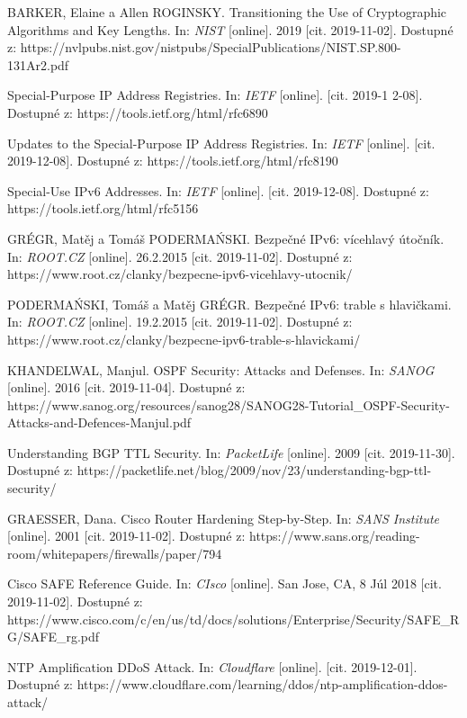 \begin{literatura}{99}
BARKER, Elaine a Allen ROGINSKY. Transitioning the Use of Cryptographic Algorithms and Key Lengths. In: \textit{NIST} [online]. 2019 [cit. 2019-11-02]. Dostupné z: https://nvlpubs.nist.gov/nistpubs/SpecialPublications/NIST.SP.800-131Ar2.pdf

Special-Purpose IP Address Registries. In: \textit{IETF} [online]. [cit. 2019-1
2-08]. Dostupné z: https://tools.ietf.org/html/rfc6890

Updates to the Special-Purpose IP Address Registries. In: \textit{IETF} [online]. [cit. 2019-12-08]. Dostupné z: https://tools.ietf.org/html/rfc8190

Special-Use IPv6 Addresses. In: \textit{IETF} [online]. [cit. 2019-12-08]. Dostupné z: https://tools.ietf.org/html/rfc5156

GRÉGR, Matěj a Tomáš PODERMAŃSKI. Bezpečné IPv6: vícehlavý útočník. In: \textit{ROOT.CZ} [online]. 26.2.2015 [cit. 2019-11-02]. Dostupné z: https://www.root.cz/clanky/bezpecne-ipv6-vicehlavy-utocnik/

PODERMAŃSKI, Tomáš a Matěj GRÉGR. Bezpečné IPv6: trable s hlavičkami. In: \textit{ROOT.CZ} [online]. 19.2.2015 [cit. 2019-11-02]. Dostupné z: https://www.root.cz/clanky/bezpecne-ipv6-trable-s-hlavickami/

KHANDELWAL, Manjul. OSPF Security: Attacks and Defenses. In: \textit{SANOG} [online]. 2016 [cit. 2019-11-04]. Dostupné z: https://www.sanog.org/resources/sanog28/SANOG28-Tutorial\_OSPF-Security-Attacks-and-Defences-Manjul.pdf

Understanding BGP TTL Security. In: \textit{PacketLife} [online]. 2009 [cit. 2019-11-30]. Dostupné z: https://packetlife.net/blog/2009/nov/23/understanding-bgp-ttl-security/

GRAESSER, Dana. Cisco Router Hardening Step-by-Step. In: \textit{SANS Institute} [online]. 2001 [cit. 2019-11-02]. Dostupné z: https://www.sans.org/reading-room/whitepapers/firewalls/paper/794

Cisco SAFE Reference Guide. In: \textit{CIsco} [online]. San Jose, CA, 8 Júl 2018 [cit. 2019-11-02]. Dostupné z: https://www.cisco.com/c/en/us/td/docs/solutions/Enterprise/Security/SAFE\_RG/SAFE\_rg.pdf

NTP Amplification DDoS Attack. In: \textit{Cloudflare} [online]. [cit. 2019-12-01]. Dostupné z: https://www.cloudflare.com/learning/ddos/ntp-amplification-ddos-attack/


\end{literatura}
